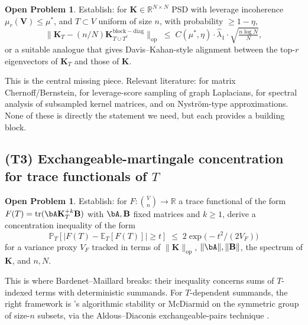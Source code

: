 \documentclass[11pt,a4paper]{article}
\theoremstyle{plain}
\theoremstyle{definition}
\newtheorem{problem}[theorem]{Open Problem}
\theoremstyle{remark}
\newcommand{\bB}{\mathbf{B}}
\newcommand{\bK}{\mathbf{K}}
\newcommand{\bV}{\mathbf{V}}
\newcommand{\E}{\mathbb{E}}
\newcommand{\R}{\mathbb{R}}
\newcommand{\PR}{\mathbb{P}}
\newcommand{\tr}{\mathrm{tr}}
\begin{document}
\begin{problem}
\label{prob:matrix-chernoff}
Establish: for $\bK \in \R^{N \times N}$ PSD with leverage incoherence
$\mu_r(\bV) \le \mu^*$, and $T \subset V$ uniform of size $n$,
with probability $\ge 1 - \eta$,
\begin{equation*}
    \big\| \bK_T - (n/N) \bK_{T \cup T^c}^{\mathrm{block-diag}} \big\|_{\mathrm{op}}
    \;\le\; C(\mu^*, \eta) \cdot \hat\lambda_1 \cdot \sqrt{\tfrac{n \log N}{N}},
\end{equation*}
or a suitable analogue that gives Davis--Kahan-style alignment
between the top-$r$ eigenvectors of $\bK_T$ and those of $\bK$.
\end{problem}

This is the central missing piece. Relevant literature:
\citet{Tropp2012} for matrix Chernoff/Bernstein,
\citet{Cohen2016sparsification} for leverage-score sampling of
graph Laplacians, \citet{DerezinskiLiaoDoblerMahoney2020} for
spectral analysis of subsampled kernel matrices, and
\citet{BachJordan2002} on Nystr\"om-type approximations. None of
these is directly the statement we need, but each provides a
building block.

\subsection{(T3) Exchangeable-martingale concentration for trace
functionals of $T$}

\begin{problem}
\label{prob:exch-conc}
Establish: for $F : \binom{V}{n} \to \R$ a trace functional of the
form $F(T) = \tr(\bA \bK_T^{+k} \bB)$ with $\bA, \bB$ fixed
matrices and $k \ge 1$, derive a concentration inequality of the
form
\begin{equation*}
    \PR_T[|F(T) - \E_T[F(T)]| \ge t]
    \;\le\; 2\exp\!\big(-t^2/(2 V_F)\big)
\end{equation*}
for a variance proxy $V_F$ tracked in terms of
$\|\bK\|_{\mathrm{op}}$, $\|\bA\|, \|\bB\|$, the spectrum of $\bK$,
and $n, N$.
\end{problem}

This is where Bardenet--Maillard breaks: their inequality concerns
sums of $T$-indexed terms with deterministic summands. For
$T$-dependent summands, the right framework is
\citet{BousquetElisseeff2002}'s algorithmic stability or McDiarmid
on the symmetric group of size-$n$ subsets, via the Aldous--Diaconis
exchangeable-pairs technique \citep{Chatterjee2007exchangeable}.
\end{document}
